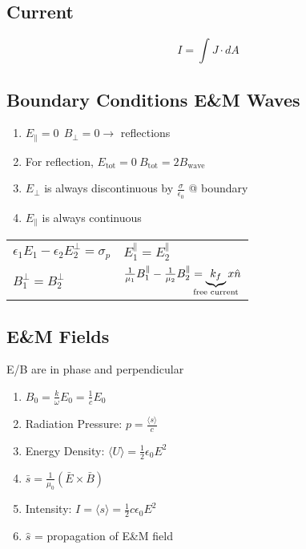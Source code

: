 \documentclass[10pt,a4paper]{article}
\begin{document}
\subsection{Current}
\begin{equation}
 I = \int J \cdot dA 
\end{equation}

\subsection{Boundary Conditions E\&M Waves}
\begin{enumerate}
    \item $E_\parallel = 0~~B_\perp = 0 \rightarrow$ reflections
    \item For reflection, $E_{\textrm{tot}} = 0~B_{\textrm{tot}} = 2B_{\textrm{wave}}$
    \item $E_\perp$ is always discontinuous by $\frac{\sigma}{\epsilon_0}$ @ boundary 
    \item $E_\parallel$ is always continuous
\end{enumerate}

\begin{tabular}{l l}
$\epsilon_1 E_1 - \epsilon_2 E_2^\perp = \sigma_p$ & $E_1^\parallel = E_2^\parallel$\\
$B_1^\perp = B_2^\perp$ & $\frac{1}{\mu_1} B_1^\parallel - \frac{1}{\mu_2}B_2^\parallel = \underbrace{k_f}_{\mathclap{\textrm{free current}}} x\hat{n}$
\end{tabular}

\subsection{E\&M Fields}
E/B are in phase and perpendicular

\begin{enumerate}
    \item $B_0 = \frac{k}{\omega}E_0 = \frac{1}{c}E_0$
    \item Radiation Pressure: $p =\frac{\langle s \rangle}{c}$
    \item Energy Density: $\langle U \rangle = \frac{1}{2}\epsilon_0 E^2$
    \item $\bar{s} = \frac{1}{\mu_0} ( \bar{E} \times \bar{B})$
    \item Intensity: $I = \langle s \rangle = \frac{1}{2} c \epsilon_0 E^2$
    \item $\hat{s}$ = propagation of E\&M field
\end{enumerate}
\end{document}
